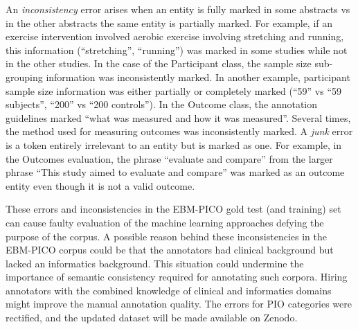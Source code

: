 \documentclass[10.7pt,]{article}
\begin{document}
An \textit{inconsistency} error arises when an entity is fully marked in some abstracts vs in the other abstracts the same entity is partially marked. 
For example, if an exercise intervention involved aerobic exercise involving stretching and running, this information (``stretching'', ``running'') was marked in some studies while not in the other studies.
In the case of the Participant class, the sample size sub-grouping information was inconsistently marked.
In another example, participant sample size information was either partially or completely marked (``59'' vs ``59 subjects'', ``200'' vs ``200 controls'').
In the Outcome class, the annotation guidelines marked ``what was measured and how it was measured''. 
Several times, the method used for measuring outcomes was inconsistently marked.
A \textit{junk} error is a token entirely irrelevant to an entity but is marked as one.
For example, in the Outcomes evaluation, the phrase ``evaluate and compare'' from the larger phrase ``This study aimed to evaluate and compare'' was marked as an outcome entity even though it is not a valid outcome.


These errors and inconsistencies in the EBM-PICO gold test (and training) set can cause faulty evaluation of the machine learning approaches defying the purpose of the corpus.
A possible reason behind these inconsistencies in the EBM-PICO corpus could be that the annotators had clinical background but lacked an informatics background.
This situation could undermine the importance of semantic consistency required for annotating such corpora.
Hiring annotators with the combined knowledge of clinical and informatics domains might improve the manual annotation quality.
The errors for PIO categories were rectified, and the updated dataset will be made available on Zenodo.
%
%
%
\end{document}
